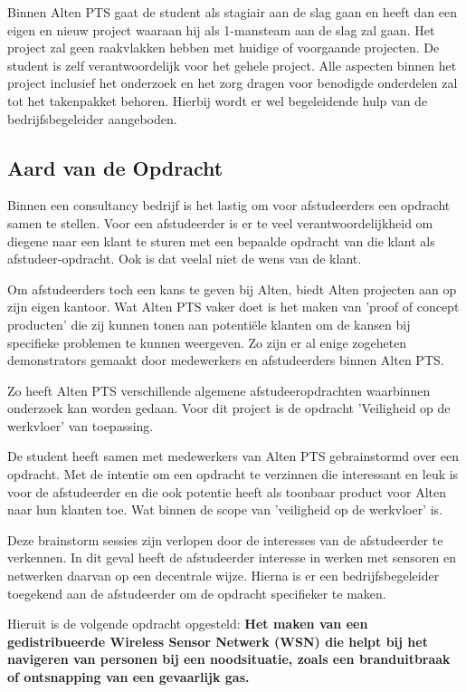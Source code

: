 \documentclass{../local}
\begin{document}
Binnen Alten PTS gaat de student als stagiair aan de slag gaan en heeft dan een eigen en nieuw project waaraan hij als 1-mansteam aan de slag zal gaan. Het project zal geen raakvlakken hebben met huidige of voorgaande projecten. De student is zelf verantwoordelijk voor het gehele project. Alle aspecten binnen het project inclusief het onderzoek en het zorg dragen voor benodigde onderdelen zal tot het takenpakket behoren. Hierbij wordt er wel begeleidende hulp van de bedrijfsbegeleider aangeboden.

\subsection{Aard van de Opdracht}

Binnen een consultancy bedrijf is het lastig om voor afstudeerders een opdracht samen te stellen. Voor een afstudeerder is er te veel verantwoordelijkheid om diegene naar een klant te sturen met een bepaalde opdracht van die klant als afstudeer-opdracht. Ook is dat veelal niet de wens van de klant. 

Om afstudeerders toch een kans te geven bij Alten, biedt Alten projecten aan op zijn eigen kantoor. Wat Alten PTS vaker doet is het maken van 'proof of concept producten' die zij kunnen tonen aan potentiële klanten om de kansen bij specifieke problemen te kunnen weergeven. Zo zijn er al enige zogeheten demonstrators gemaakt door medewerkers en afstudeerders binnen Alten PTS.

Zo heeft Alten PTS verschillende algemene afstudeeropdrachten waarbinnen onderzoek kan worden gedaan. Voor dit project is de opdracht 'Veiligheid op de werkvloer' van toepassing.

De student heeft samen met medewerkers van Alten PTS gebrainstormd over een opdracht. Met de intentie om een opdracht te verzinnen die interessant en leuk is voor de afstudeerder en die ook potentie heeft als toonbaar product voor Alten naar hun klanten toe. Wat binnen de scope van 'veiligheid op de werkvloer' is.

Deze brainstorm sessies zijn verlopen door de interesses van de afstudeerder te verkennen. In dit geval heeft de afstudeerder interesse in werken met sensoren en netwerken daarvan op een decentrale wijze. Hierna is er een bedrijfsbegeleider toegekend aan de afstudeerder om de opdracht specifieker te maken.


Hieruit is de volgende opdracht opgesteld: 	
\textbf{
Het maken van een gedistribueerde Wireless Sensor Netwerk (WSN) die helpt bij het navigeren van personen bij een noodsituatie, zoals een branduitbraak of ontsnapping van een gevaarlijk gas.
}
\end{document}
